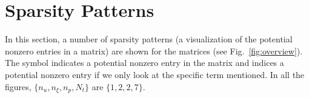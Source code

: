 \section{Sparsity Patterns}

In this section, a number of sparsity patterns (a visualization of the potential nonzero entries in a matrix) are shown for the \qp{} matrices (see Fig.~\ref{fig:overview}).
The symbol \scalebox{1.5}{\mysparsesymbol} indicates a potential nonzero entry in the matrix and \scalebox{1.5}{\mytemp} indices a potential nonzero entry if we only look at the specific term mentioned.
In all the figures, $\{n_u, n_\xi, n_p, N_t \}$ are $\{1, 2, 2, 7\}$.









